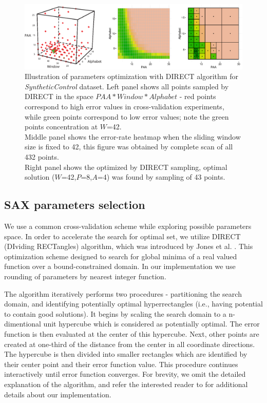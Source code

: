 \documentclass{llncs}
\begin{document}
\begin{figure}[t]
   \centering
   \includegraphics[width=120mm]{figures/figure_direct.eps}
   \caption{Illustration of parameters
optimization with DIRECT algorithm for \textit{SyntheticControl} dataset. Left panel shows
all points sampled by DIRECT in the space $PAA*Window*Alphabet$ - red points correspond to high
error values in cross-validation experiments, while green points correspond to low error values;
note the green points concentration at $W$=42.\\ 
Middle panel shows the error-rate heatmap when the sliding window size is fixed to 42, this figure
was obtained by complete scan of all 432 points.\\ 
Right panel shows the optimized by DIRECT sampling,
optimal solution ($W$=42,$P$=8,$A$=4) was found by sampling of 43 points.}
   \label{fig:direct-sampling}
\end{figure}

\subsection{SAX parameters selection} \label{section-direct}
We use a common cross-validation scheme while exploring possible parameters space. 
In order to accelerate the search for optimal set, 
we utilize DIRECT (DIviding RECTangles) algorithm, which 
was introduced by Jones et al. \cite{direct-original}. This optimization scheme 
designed to search for global minima of a real valued function over a bound-constrained domain. 
In our implementation we use rounding of parameters by nearest integer function.

The algorithm iteratively performs two procedures - partitioning the search domain, 
and identifying potentially optimal hyperrectangles (i.e., having potential to contain good
solutions). 
It begins by scaling the search domain to a n-dimentional unit hypercube which is considered 
as potentially optimal. The error function is then evaluated at the center of this hypercube. Next, 
other points are created at one-third of the distance from the center in all coordinate directions. 
The hypercube is then divided into smaller rectangles which are identified by their center point 
and their error function value. This procedure continues interactively until error function
converges.
For brevity, we omit the detailed explanation of the algorithm, and refer the 
interested reader to \cite{direct} for additional details about our implementation.
\end{document}
